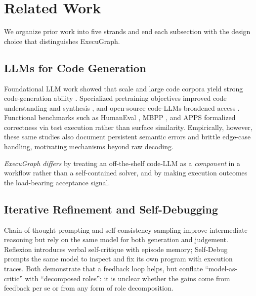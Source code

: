 \documentclass[journal]{IEEEtran}
\begin{document}
\section{Related Work}\label{sec:related}

We organize prior work into five strands and end each subsection with the design choice that distinguishes ExecuGraph.

\subsection{LLMs for Code Generation}
Foundational LLM work showed that scale and large code corpora yield strong code-generation ability \cite{brown2020gpt3,chen2021codex,chowdhery2022palm}. Specialized pretraining objectives improved code understanding and synthesis \cite{feng2020codebert,wang2021codet5}, and open-source code-LLMs broadened access \cite{nijkamp2022codegen,fried2022incoder}. Functional benchmarks such as HumanEval \cite{chen2021codex}, MBPP \cite{austin2021mbpp}, and APPS \cite{hendrycks2021apps} formalized correctness via test execution rather than surface similarity. Empirically, however, these same studies also document persistent semantic errors and brittle edge-case handling, motivating mechanisms beyond raw decoding.

\textit{ExecuGraph differs} by treating an off-the-shelf code-LLM as a \emph{component} in a workflow rather than a self-contained solver, and by making execution outcomes the load-bearing acceptance signal.

\subsection{Iterative Refinement and Self-Debugging}
Chain-of-thought prompting \cite{wei2022cot} and self-consistency sampling \cite{wang2022selfconsistency} improve intermediate reasoning but rely on the same model for both generation and judgement. Reflexion \cite{shinn2023reflexion} introduces verbal self-critique with episode memory; Self-Debug \cite{chen2023selfdebug} prompts the same model to inspect and fix its own program with execution traces. Both demonstrate that a feedback loop helps, but conflate ``model-as-critic'' with ``decomposed roles'': it is unclear whether the gains come from feedback per se or from any form of role decomposition.
\end{document}

